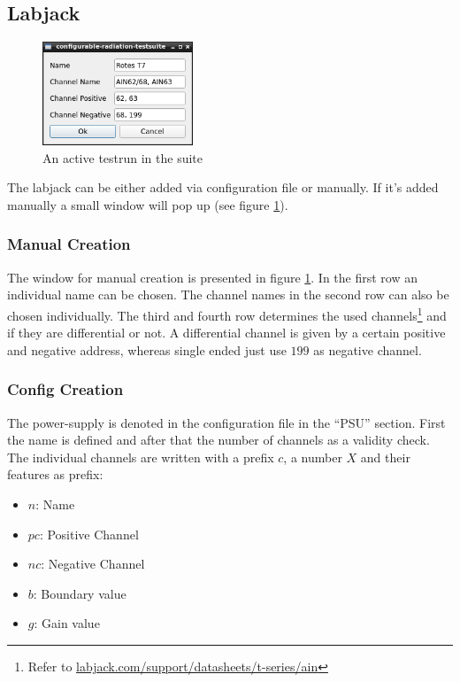 \documentclass[10pt,a4paper]{article}
\begin{document}
	\subsection{Labjack}
	
	\begin{figure}[H]
	\centering
	\includegraphics[width=0.4\textwidth]{./3_LBJ_menu.png}
	\caption{An active testrun in the suite}
	\label{f:lbj_menu}
	\end{figure}
	
	The labjack can be either added via configuration file or manually. If it's added manually a small window will pop up (see figure \ref{f:lbj_menu}).
	
	\subsubsection{Manual Creation}	
	
	The window for manual creation is presented in figure \ref{f:lbj_menu}. In the first row an individual name can be chosen. The channel names in the second row can also be chosen individually. The third and fourth row determines the used channels\footnote{Refer to \url{labjack.com/support/datasheets/t-series/ain}} and if they are differential or not. A differential channel is given by a certain positive and negative address, whereas single ended just use $199$ as negative channel.
	
	\subsubsection{Config Creation}	
	The power-supply is denoted in the configuration file in the \enquote{PSU} section. First the name is defined and after that the number of channels as a validity check. The individual channels are written with a prefix $c$, a number $X$ and their features as prefix:
	
	\begin{itemize}
	\item $n$: Name
	\item $pc$: Positive Channel
	\item $nc$: Negative Channel
	\item $b$: Boundary value
	\item $g$: Gain value
	\end{itemize}
	
\end{document}
